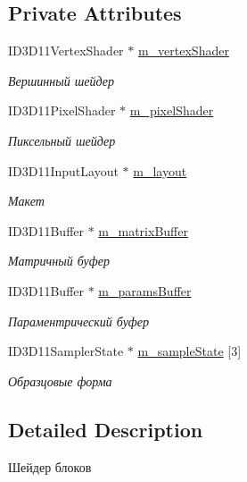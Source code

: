 \subsection*{Private Attributes}
\begin{DoxyCompactItemize}
\item 
I\+D3\+D11\+Vertex\+Shader $\ast$ \hyperlink{class_terrain_shader_class_a0b24a581966a0e25829024f2357999fc}{m\+\_\+vertex\+Shader}
\begin{DoxyCompactList}\small\item\em Вершинный шейдер \end{DoxyCompactList}\item 
I\+D3\+D11\+Pixel\+Shader $\ast$ \hyperlink{class_terrain_shader_class_a5abded257193a1328f62987de0bf8033}{m\+\_\+pixel\+Shader}
\begin{DoxyCompactList}\small\item\em Пиксельный шейдер \end{DoxyCompactList}\item 
I\+D3\+D11\+Input\+Layout $\ast$ \hyperlink{class_terrain_shader_class_a1c1c2604ee759d4a5ddef29b973ac88e}{m\+\_\+layout}
\begin{DoxyCompactList}\small\item\em Макет \end{DoxyCompactList}\item 
I\+D3\+D11\+Buffer $\ast$ \hyperlink{class_terrain_shader_class_a985e97f309777708af827deda906df06}{m\+\_\+matrix\+Buffer}
\begin{DoxyCompactList}\small\item\em Матричный буфер \end{DoxyCompactList}\item 
I\+D3\+D11\+Buffer $\ast$ \hyperlink{class_terrain_shader_class_a9ea01b18ac0d28ebb27ab7dc6e3fbcae}{m\+\_\+params\+Buffer}
\begin{DoxyCompactList}\small\item\em Параментрический буфер \end{DoxyCompactList}\item 
I\+D3\+D11\+Sampler\+State $\ast$ \hyperlink{class_terrain_shader_class_a2184b9c2adef7d2f2dd5ad666343e0b9}{m\+\_\+sample\+State} \mbox{[}3\mbox{]}
\begin{DoxyCompactList}\small\item\em Образцовые форма \end{DoxyCompactList}\end{DoxyCompactItemize}


\subsection{Detailed Description}
Шейдер блоков 

